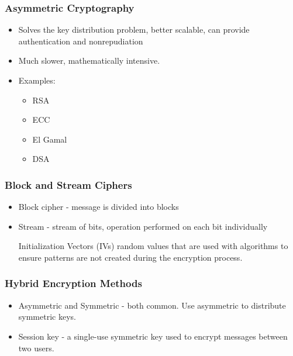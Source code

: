 \documentclass[11pt]{article}
\begin{document}
\subsubsection{Asymmetric Cryptography}
\label{sec:org127571c}
\begin{itemize}
\item Solves the key distribution problem, better scalable, can provide authentication and nonrepudiation
\item Much slower, mathematically intensive.
\item Examples:
\begin{itemize}
\item RSA
\item ECC
\item El Gamal
\item DSA
\end{itemize}
\end{itemize}
\subsubsection{Block and Stream Ciphers}
\label{sec:orgc2307f1}
\begin{itemize}
\item Block cipher - message is divided into blocks
\item Stream - stream of bits, operation performed on each bit individually
\item[{Initialization Vectors (IVs)}] random values that are used with algorithms to ensure patterns are not created during the encryption process.
\end{itemize}
\subsubsection{Hybrid Encryption Methods}
\label{sec:org6b07626}
\begin{itemize}
\item Asymmetric and Symmetric - both common. Use asymmetric to distribute symmetric keys.
\item Session key - a single-use symmetric key used to encrypt messages between two users.
\end{itemize}
\end{document}
